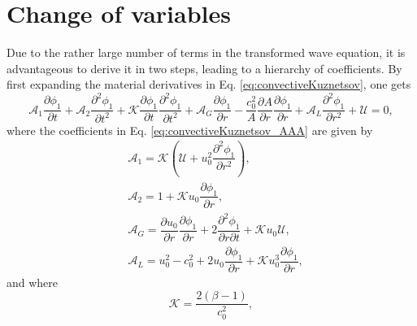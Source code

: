 \chapter{Change of variables}
\label{chap:Appendix}

Due to the rather large number of terms in the transformed wave equation, it is advantageous to derive it in two steps, leading to a hierarchy of coefficients. By first expanding the material derivatives in Eq. \eqref{eq:convectiveKuznetsov}, one gets
\begin{equation}
    \mathcal{A}_1 \dfrac{\partial \phi_1}{\partial t}
    + \mathcal{A}_2 \dfrac{\partial^2 \phi_1}{\partial t^2}
    + \mathcal{K} \dfrac{\partial \phi_1}{\partial t}\dfrac{\partial^2 \phi_1}{\partial t^2}
    + \mathcal{A}_G \dfrac{\partial \phi_1}{\partial r} - \dfrac{c_0^2}{A}\dfrac{\partial A}{\partial r} \dfrac{\partial \phi_1}{\partial r} + \mathcal{A}_L \dfrac{\partial^2 \phi_1}{\partial r^2}
    + \mathcal{U} = 0,
    \label{eq:convectiveKuznetsov_AAA}
\end{equation}
where the coefficients in Eq. \eqref{eq:convectiveKuznetsov_AAA} are given by
\begin{align}
     & \mathcal{A}_1 = \mathcal{K}\left(\mathcal{U} + u_0^2\dfrac{\partial^2\phi_1}{\partial r^2}\right),
    \label{eq:A1}                                                                                                                                                           \\
     & \mathcal{A}_2 = 1 + \mathcal{K}u_0\dfrac{\partial \phi_1}{\partial r},
    \label{eq:A2}                                                                                                                                                           \\
     & \mathcal{A}_G = \dfrac{\partial u_0}{\partial r}\dfrac{\partial \phi_1}{\partial r} + 2\dfrac{\partial^2 \phi_1}{\partial r\partial t} + \mathcal{K}u_0 \mathcal{U},
    \label{eq:AG}                                                                                                                                                           \\
     & \mathcal{A}_L = u_0^2 - c_0^2 + 2u_0\dfrac{\partial \phi_1}{\partial r} + \mathcal{K}u_0^3\dfrac{\partial \phi_1}{\partial r},
    \label{eq:AL}
\end{align}
and where
\begin{equation}
    \mathcal{K} = \dfrac{2\left(\beta - 1\right)}{c_0^2},
    \label{eq:Kcoeff}
\end{equation}
